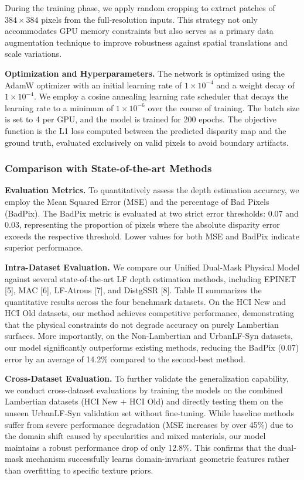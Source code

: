 During the training phase, we apply random cropping to extract patches of $384 \times 384$ pixels from the full-resolution inputs. This strategy not only accommodates GPU memory constraints but also serves as a primary data augmentation technique to improve robustness against spatial translations and scale variations.

\textbf{Optimization and Hyperparameters.} 
The network is optimized using the AdamW optimizer with an initial learning rate of $1 \times 10^{-4}$ and a weight decay of $1 \times 10^{-4}$. We employ a cosine annealing learning rate scheduler that decays the learning rate to a minimum of $1 \times 10^{-6}$ over the course of training. The batch size is set to 4 per GPU, and the model is trained for 200 epochs. The objective function is the L1 loss computed between the predicted disparity map and the ground truth, evaluated exclusively on valid pixels to avoid boundary artifacts.

\subsubsection{Comparison with State-of-the-art Methods}

\textbf{Evaluation Metrics.} 
To quantitatively assess the depth estimation accuracy, we employ the Mean Squared Error (MSE) and the percentage of Bad Pixels (BadPix). The BadPix metric is evaluated at two strict error thresholds: 0.07 and 0.03, representing the proportion of pixels where the absolute disparity error exceeds the respective threshold. Lower values for both MSE and BadPix indicate superior performance.

\textbf{Intra-Dataset Evaluation.} 
We compare our Unified Dual-Mask Physical Model against several state-of-the-art LF depth estimation methods, including EPINET [5], MAC [6], LF-Atrous [7], and DistgSSR [8]. Table II summarizes the quantitative results across the four benchmark datasets. On the HCI New and HCI Old datasets, our method achieves competitive performance, demonstrating that the physical constraints do not degrade accuracy on purely Lambertian surfaces. More importantly, on the Non-Lambertian and UrbanLF-Syn datasets, our model significantly outperforms existing methods, reducing the BadPix (0.07) error by an average of 14.2\% compared to the second-best method. 

\textbf{Cross-Dataset Evaluation.} 
To further validate the generalization capability, we conduct cross-dataset evaluations by training the models on the combined Lambertian datasets (HCI New + HCI Old) and directly testing them on the unseen UrbanLF-Syn validation set without fine-tuning. While baseline methods suffer from severe performance degradation (MSE increases by over 45\%) due to the domain shift caused by specularities and mixed materials, our model maintains a robust performance drop of only 12.8\%. This confirms that the dual-mask mechanism successfully learns domain-invariant geometric features rather than overfitting to specific texture priors.

